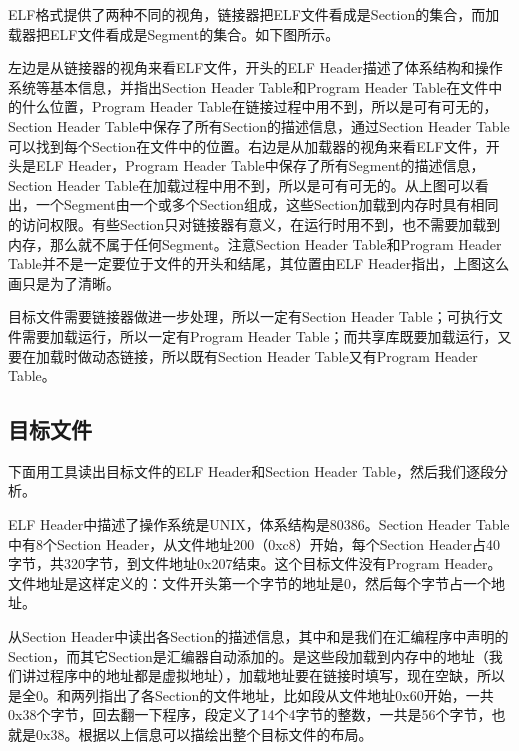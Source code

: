ELF格式提供了两种不同的视角，链接器把ELF文件看成是Section的集合，而加载器把ELF文件看成是Segment的集合。如下图所示。




左边是从链接器的视角来看ELF文件，开头的ELF Header描述了体系结构和操作系统等基本信息，并指出Section Header Table和Program Header Table在文件中的什么位置，Program Header Table在链接过程中用不到，所以是可有可无的，Section Header Table中保存了所有Section的描述信息，通过Section Header Table可以找到每个Section在文件中的位置。右边是从加载器的视角来看ELF文件，开头是ELF Header，Program Header Table中保存了所有Segment的描述信息，Section Header Table在加载过程中用不到，所以是可有可无的。从上图可以看出，一个Segment由一个或多个Section组成，这些Section加载到内存时具有相同的访问权限。有些Section只对链接器有意义，在运行时用不到，也不需要加载到内存，那么就不属于任何Segment。注意Section Header Table和Program Header Table并不是一定要位于文件的开头和结尾，其位置由ELF Header指出，上图这么画只是为了清晰。



目标文件需要链接器做进一步处理，所以一定有Section Header Table；可执行文件需要加载运行，所以一定有Program Header Table；而共享库既要加载运行，又要在加载时做动态链接，所以既有Section Header Table又有Program Header Table。


\subsection{目标文件}
%


下面用工具读出目标文件的ELF Header和Section Header Table，然后我们逐段分析。




ELF Header中描述了操作系统是UNIX，体系结构是80386。Section Header Table中有8个Section Header，从文件地址200（0xc8）开始，每个Section Header占40字节，共320字节，到文件地址0x207结束。这个目标文件没有Program Header。文件地址是这样定义的：文件开头第一个字节的地址是0，然后每个字节占一个地址。




从Section Header中读出各Section的描述信息，其中和是我们在汇编程序中声明的Section，而其它Section是汇编器自动添加的。是这些段加载到内存中的地址（我们讲过程序中的地址都是虚拟地址），加载地址要在链接时填写，现在空缺，所以是全0。和两列指出了各Section的文件地址，比如段从文件地址0x60开始，一共0x38个字节，回去翻一下程序，段定义了14个4字节的整数，一共是56个字节，也就是0x38。根据以上信息可以描绘出整个目标文件的布局。


